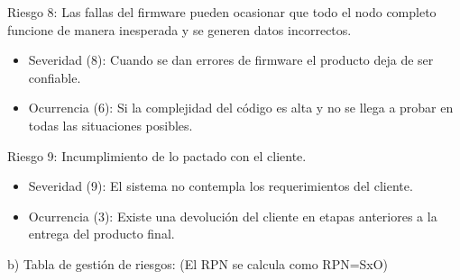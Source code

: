 \documentclass[
11pt, %
]{charter}
\begin{document}
Riesgo 8: Las fallas del firmware pueden ocasionar que todo el nodo completo funcione de manera inesperada y se generen datos incorrectos.
\begin{itemize}
	\item Severidad (8): Cuando se dan errores de firmware el producto deja de ser confiable.
	\item Ocurrencia (6): Si la complejidad del código es alta y no se llega a probar en todas las situaciones posibles.
\end{itemize}

Riesgo 9: Incumplimiento de lo pactado con el cliente.
\begin{itemize}
	\item Severidad (9): El sistema no contempla los requerimientos del cliente.
	\item Ocurrencia (3): Existe una devolución del cliente en etapas anteriores a la entrega del producto final.
\end{itemize}


b) Tabla de gestión de riesgos:      (El RPN se calcula como RPN=SxO)

\end{document}
